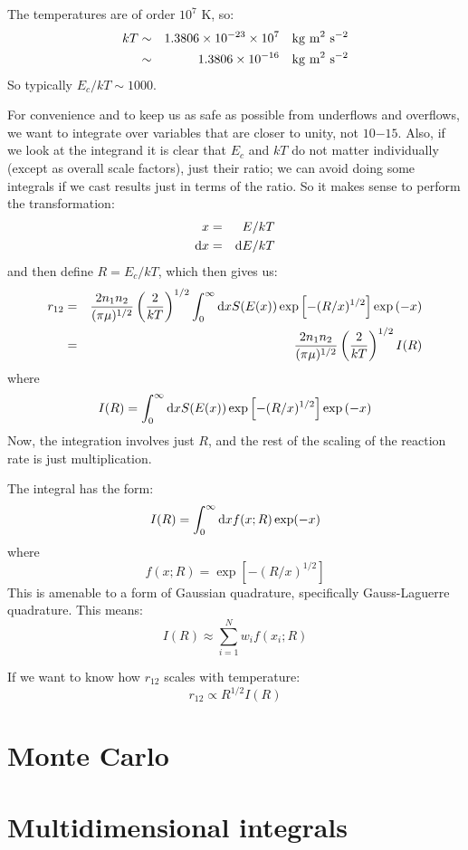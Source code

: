 The temperatures are of order $10^7$ K, so:
\begin{eqnarray}
  kT &\sim&
  1.3806 \times 10^{-23} \times 10^{7} \mathrm{\quad kg~m}^2\mathrm{~s}^{-2}\cr
&\sim& 
  1.3806 \times 10^{-16} \mathrm{\quad kg~m}^2\mathrm{~s}^{-2}
\end{eqnarray}
So typically $E_c/kT \sim 1000$.

For convenience and to keep us as safe as possible from underflows and
overflows, we want to integrate over variables that are closer to
unity, not $10{-15}$. Also, if we look at the integrand it is clear
that $E_c$ and $kT$ do not matter individually (except as overall
scale factors), just their ratio; we can avoid doing some integrals if
we cast results just in terms of the ratio.  So it makes sense to
perform the transformation:
\begin{eqnarray}
 x &=& E / kT \cr
 {\rm d}x &=& {\rm d}E / kT
\end{eqnarray}
and then define $R = E_c /kT$,
which then gives us:
\begin{eqnarray}
r_{12} &=& \frac{2 n_1 n_2}{(\pi \mu)^{1/2}}
\left(\frac{2}{kT}\right)^{1/2}
\int_0^\infty {\rm d}x S(E(x))
\exp\left[-(R/x)^{1/2}\right] \exp\left(- x \right) \cr
&=& \frac{2 n_1 n_2}{(\pi \mu)^{1/2}}
\left(\frac{2}{kT}\right)^{1/2} I(R)
\end{eqnarray}
where
\begin{equation}
I(R) = \int_0^\infty {\rm d}x S(E(x))
\exp\left[-(R/x)^{1/2}\right] \exp\left(- x \right) 
\end{equation}
Now, the integration involves just $R$, and the rest of the scaling of
the reaction rate is just multiplication.

The integral has the form:
\begin{equation}
I(R) = \int_0^{\infty} {\rm d}x f(x; R) \exp(-x)
\end{equation}
where
\begin{equation}
f(x; R) = 
\exp\left[-(R/x)^{1/2}\right]
\end{equation}
This is amenable to a form of Gaussian quadrature, specifically
Gauss-Laguerre quadrature. This means:
\begin{equation}
I(R) \approx \sum_{i=1}^N w_i f(x_i; R)
\end{equation}

If we want to know how $r_{12}$ scales with temperature:
\begin{equation}
r_{12} \propto R^{1/2} I(R)
\end{equation}

\section{Monte Carlo}

\section{Multidimensional integrals}
